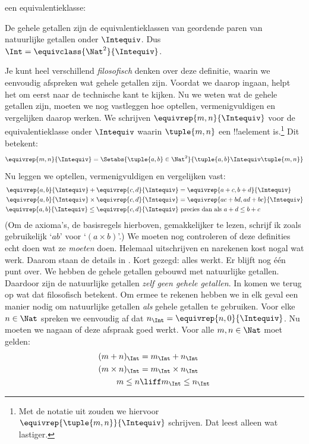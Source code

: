 \documentclass[openany]{memoir}
\begin{document}
een equivalentieklasse:
\begin{defn}
		De gehele getallen zijn de equivalentieklassen van geordende paren
		van natuurlijke getallen onder $\Intequiv$. Dus $\Int =
		\equivclass{\Nat^2}{\Intequiv}$.
\end{defn}
Je kunt heel verschillend \emph{filosofisch} denken over deze
definitie, waarin we eenvoudig afspreken wat gehele getallen zijn.
Voordat we daarop ingaan, helpt het om eerst naar de technische kant te kijken.
Nu we weten wat de gehele getallen zijn, moeten we nog vastleggen hoe
optellen, vermenigvuldigen en vergelijken daarop werken. We schrijven
$\equivrep{m, n}{\Intequiv}$ voor de equivalentieklasse onder $\Intequiv$ waarin
$\tuple{m, n}$ een !!a{element} is.\footnote{Met de notatie uit
 zouden we hiervoor
$\equivrep{\tuple{m,n}}{\Intequiv}$ schrijven. Dat leest alleen wat
lastiger.} Dit betekent:
	$$\equivrep{m, n}{\Intequiv} = \Setabs{\tuple{a, b} \in \Nat^2}{\tuple{a, b}\Intequiv \tuple{m, n}}$$
Nu leggen we optellen, vermenigvuldigen en vergelijken vast:
	\begin{align*}
		\equivrep{a, b}{\Intequiv} + \equivrep{c, d}{\Intequiv} &= \equivrep{a + c, b + d}{\Intequiv}\\
		\equivrep{a, b}{\Intequiv} \times \equivrep{c, d}{\Intequiv} &= \equivrep{a c + b  d, a  d + b c}{\Intequiv}\\
		\equivrep{a, b}{\Intequiv} \leq \equivrep{c, d}{\Intequiv} &\text{ precies dan als }a + d \leq b + c
	\end{align*}	
(Om de axioma's, de basisregels hierboven, gemakkelijker te lezen,
schrijf ik zoals gebruikelijk `$ab$' voor `$(a \times b)$'.) We moeten
nog controleren of deze definities echt doen wat ze \emph{moeten} doen.
Helemaal uitschrijven en narekenen kost nogal wat werk. Daarom staan de
details in . Kort gezegd: alles werkt.
Er blijft nog één punt over. We hebben de gehele getallen gebouwd met
natuurlijke getallen. Daardoor zijn de natuurlijke getallen \emph{zelf
geen gehele getallen}. In  komen we terug op wat dat
filosofisch betekent. Om ermee te rekenen hebben we in elk geval een
manier nodig om natuurlijke getallen \emph{als} gehele getallen te
gebruiken. Voor elke $n \in \Nat$ spreken we eenvoudig af dat $n_\Int
= \equivrep{n, 0}{\Intequiv}$. Nu moeten we nagaan of deze
afspraak goed werkt. Voor alle $m, n \in \Nat$ moet gelden:
\begin{align*}
	(m + n)_\Int &= m_\Int + n_\Int\\
	(m \times n)_\Int &= m_\Int \times n_\Int\\
	m \leq n &\liff m_\Int \leq n_\Int
\end{align*}
\end{document}
